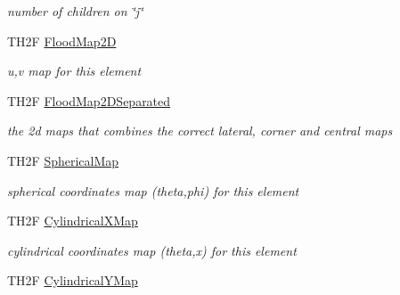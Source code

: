 \begin{DoxyCompactItemize}
\begin{DoxyCompactList}\small\item\em number of children on \char`\"{}j\char`\"{} \end{DoxyCompactList}\item 
\hypertarget{classElement_adb8076cb5e85bbd5b22ff0469fbf120c}{T\+H2\+F \hyperlink{classElement_adb8076cb5e85bbd5b22ff0469fbf120c}{Flood\+Map2\+D}}\label{classElement_adb8076cb5e85bbd5b22ff0469fbf120c}

\begin{DoxyCompactList}\small\item\em u,v map for this element \end{DoxyCompactList}\item 
\hypertarget{classElement_a6e1fe25cbd51761ff59d92bfd380b58e}{T\+H2\+F \hyperlink{classElement_a6e1fe25cbd51761ff59d92bfd380b58e}{Flood\+Map2\+D\+Separated}}\label{classElement_a6e1fe25cbd51761ff59d92bfd380b58e}

\begin{DoxyCompactList}\small\item\em the 2d maps that combines the correct lateral, corner and central maps \end{DoxyCompactList}\item 
\hypertarget{classElement_acbf98095e81976bfad9aa6a0cae62687}{T\+H2\+F \hyperlink{classElement_acbf98095e81976bfad9aa6a0cae62687}{Spherical\+Map}}\label{classElement_acbf98095e81976bfad9aa6a0cae62687}

\begin{DoxyCompactList}\small\item\em spherical coordinates map (theta,phi) for this element \end{DoxyCompactList}\item 
\hypertarget{classElement_a41a0b90394cc0d4460c47566eeba6739}{T\+H2\+F \hyperlink{classElement_a41a0b90394cc0d4460c47566eeba6739}{Cylindrical\+X\+Map}}\label{classElement_a41a0b90394cc0d4460c47566eeba6739}

\begin{DoxyCompactList}\small\item\em cylindrical coordinates map (theta,x) for this element \end{DoxyCompactList}\item 
\hypertarget{classElement_ac147ebacd2963fb1ef2baed0014e160c}{T\+H2\+F \hyperlink{classElement_ac147ebacd2963fb1ef2baed0014e160c}{Cylindrical\+Y\+Map}}\label{classElement_ac147ebacd2963fb1ef2baed0014e160c}


\end{DoxyCompactItemize}
